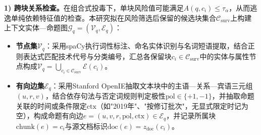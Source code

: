\textbf{1) 跨块关系检查。}在组合式投毒下，单块风险值可能满足$A(q,c_i)\le\tau_\alpha$\cite{zheng2025grada,zhou2025trustrag}，从而逃逸单纯依赖特征值的检查。本研究拟在风险筛选后保留的候选块集合$\mathcal C_{\mathrm{surv}}$上构建上下文实体—命题图$\mathcal G_q=(\mathcal V_q,\mathcal E_q)$：
\begin{itemize}[leftmargin=2em,itemsep=0pt]
  \item \textbf{节点集$\mathcal V_q$}：采用spaCy\cite{honnibal2020spacy}执行词性标注、命名实体识别与名词短语提取，结合正则表达式匹配技术代号与分类编号，汇总各保留块$c_i\in\mathcal C_{\mathrm{surv}}$中的实体与属性节点构成$\mathcal V_q=\bigcup_{c_i\in\mathcal C_{\mathrm{surv}}}\mathcal E(c_i)$。
  \item \textbf{有向边集$\mathcal E_q$}：采用Stanford OpenIE\cite{angeli2015leveraging}抽取文本块中的主语—关系—宾语三元组$(u,r,v)$，结合依存句法与否定词规则判定极性$\mathrm{pol}\in\{+1,-1\}$，并抽取命题关联的时间或条件限定$\mathrm{ctx}$（如"2019年"、"按修订批次"，无显式限定时记为空），构成命题有向边$e=(u,v,r,\mathrm{pol},\mathrm{ctx})\in\mathcal E_q$，并记录所属块$\mathrm{chunk}(e)=c_i$与源文档标识$\mathrm{doc}(e)=z_{\mathrm{doc}}(c_i)$。
\end{itemize}


